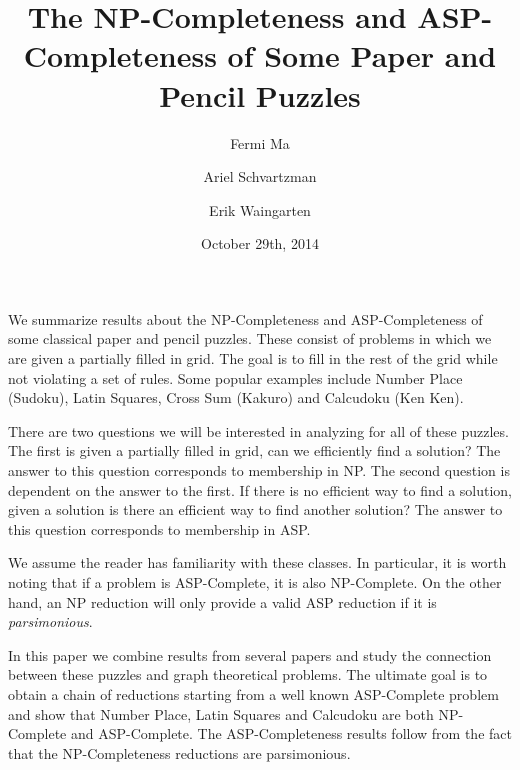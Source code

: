 \documentclass[runningheads,a4paper]{llncs}
\date{October 29th, 2014}							%
\begin{document}
\title{The NP-Completeness and ASP-Completeness of Some Paper and Pencil Puzzles}
\titlerunning{}

\author{Fermi Ma \and Ariel Schvartzman \and Erik Waingarten}
%


\maketitle

We summarize results about the NP-Completeness and ASP-Completeness of some classical paper and pencil puzzles. These consist of problems in which we are given a partially filled in grid. The goal is to fill in the rest of the grid while not violating a set of rules. Some popular examples include Number Place (Sudoku), Latin Squares, Cross Sum (Kakuro) and Calcudoku (Ken Ken). 

There are two questions we will be interested in analyzing for all of these puzzles. The first is given a partially filled in grid, can we efficiently find a solution? The answer to this question corresponds to membership in NP.
The second question is dependent on the answer to the first. If there is no efficient way to find a solution, given a solution is there an efficient way to find another solution? The answer to this question corresponds to membership in ASP. 

We assume the reader has familiarity with these classes. In particular, it is worth noting that if a problem is ASP-Complete, it is also NP-Complete. On the other hand, an NP reduction will only provide a valid ASP reduction if it is \textit{parsimonious}. 

In this paper we combine results from several papers and study the connection between these puzzles and graph theoretical problems. The ultimate goal is to obtain a chain of reductions starting from a well known ASP-Complete problem and show that Number Place, Latin Squares and Calcudoku are both NP-Complete and ASP-Complete. The ASP-Completeness results follow from the fact that the NP-Completeness reductions are parsimonious. 
\end{document}
